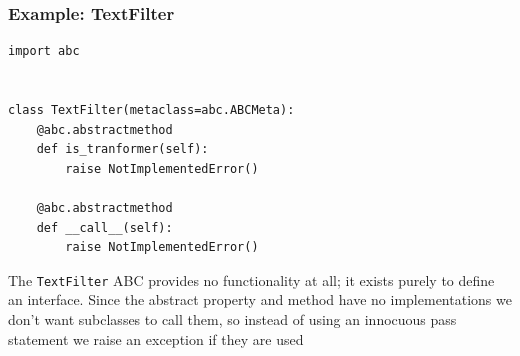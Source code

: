 \subsubsection{Example: TextFilter}

\begin{lstlisting}
import abc


class TextFilter(metaclass=abc.ABCMeta):
    @abc.abstractmethod
    def is_tranformer(self):
        raise NotImplementedError()

    @abc.abstractmethod
    def __call__(self):
        raise NotImplementedError()  
\end{lstlisting}

The \verb|TextFilter| ABC provides no functionality at all; it exists purely to define an interface.
Since the abstract property and method have no implementations we don’t want subclasses to call them, so instead of using an innocuous pass statement we raise an exception if they are used



